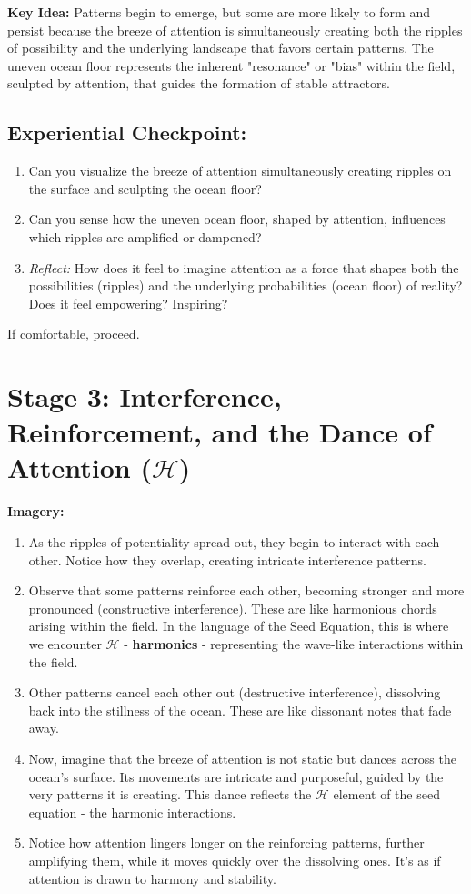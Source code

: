 \documentclass[12pt,a4paper]{article}
\begin{document}
\textbf{Key Idea:} Patterns begin to emerge, but some are more likely to form and persist because the breeze of attention is simultaneously creating both the ripples of possibility and the underlying landscape that favors certain patterns. The uneven ocean floor represents the inherent "resonance" or "bias" within the field, sculpted by attention, that guides the formation of stable attractors.

\subsection*{Experiential Checkpoint:}
\begin{enumerate}
    \item Can you visualize the breeze of attention simultaneously creating ripples on the surface and sculpting the ocean floor?
    \item Can you sense how the uneven ocean floor, shaped by attention, influences which ripples are amplified or dampened?
    \item \textit{Reflect:} How does it feel to imagine attention as a force that shapes both the possibilities (ripples) and the underlying probabilities (ocean floor) of reality? Does it feel empowering? Inspiring?
\end{enumerate}

If comfortable, proceed.

\section*{Stage 3: Interference, Reinforcement, and the Dance of Attention (\(\mathcal{H}\))}

\textbf{Imagery:}
\begin{enumerate}
    \item As the ripples of potentiality spread out, they begin to interact with each other. Notice how they overlap, creating intricate interference patterns.
    \item Observe that some patterns reinforce each other, becoming stronger and more pronounced (constructive interference). These are like harmonious chords arising within the field.  In the language of the Seed Equation, this is where we encounter  \(\mathcal{H}\) - \textbf{harmonics} - representing the wave-like interactions within the field.
    \item Other patterns cancel each other out (destructive interference), dissolving back into the stillness of the ocean. These are like dissonant notes that fade away.
    \item Now, imagine that the breeze of attention is not static but dances across the ocean's surface. Its movements are intricate and purposeful, guided by the very patterns it is creating.  This dance reflects the \(\mathcal{H}\) element of the seed equation - the harmonic interactions.
    \item Notice how attention lingers longer on the reinforcing patterns, further amplifying them, while it moves quickly over the dissolving ones. It's as if attention is drawn to harmony and stability.
\end{enumerate}
\end{document}
